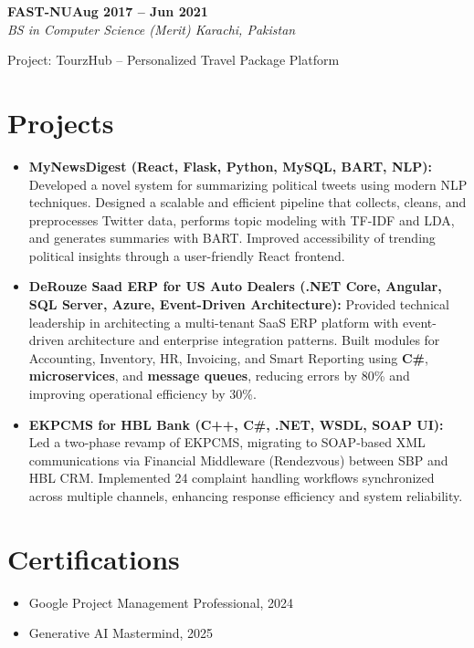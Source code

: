 \documentclass[letterpaper,10pt]{article}
\newcommand{\headingBf}[2]{
  \hspace{10pt}\textbf{#1}\hfill\textbf{#2}\\
}
\newcommand{\headingIt}[2]{
  \hspace{10pt}\textit{#1}\hfill\textit{#2}\\
}
\newenvironment{resume_list}{
  \vspace{-7pt}
  \begin{itemize}[itemsep=-2px, parsep=1pt, leftmargin=30pt]
}{
  \end{itemize}
}
\begin{document}
\headingBf{FAST-NU}{Aug 2017 -- Jun 2021}
\headingIt{BS in Computer Science (Merit) \hfill Karachi, Pakistan}{}
\begin{resume_list}
    \item Project: TourzHub -- Personalized Travel Package Platform
\end{resume_list}

\section{Projects}
\begin{itemize}
    \setlength\itemsep{3pt}
    \item \textbf{MyNewsDigest (React, Flask, Python, MySQL, BART, NLP):} Developed a novel system for summarizing political tweets using modern NLP techniques. Designed a scalable and efficient pipeline that collects, cleans, and preprocesses Twitter data, performs topic modeling with TF-IDF and LDA, and generates summaries with BART. Improved accessibility of trending political insights through a user-friendly React frontend.
    \item \textbf{DeRouze Saad ERP for US Auto Dealers (.NET Core, Angular, SQL Server, Azure, Event-Driven Architecture): } Provided technical leadership in architecting a multi-tenant SaaS ERP platform with event-driven architecture and enterprise integration patterns. Built modules for Accounting, Inventory, HR, Invoicing, and Smart Reporting using \textbf{C\#}, \textbf{microservices}, and \textbf{message queues}, reducing errors by 80\% and improving operational efficiency by 30\%.
    \item \textbf{EKPCMS for HBL Bank (C++, C\#, .NET, WSDL, SOAP UI):} Led a two-phase revamp of EKPCMS, migrating to SOAP-based XML communications via Financial Middleware (Rendezvous) between SBP and HBL CRM. Implemented 24 complaint handling workflows synchronized across multiple channels, enhancing response efficiency and system reliability.
\end{itemize}

\section{Certifications}
\begin{itemize}
    \item Google Project Management Professional, 2024
    \item Generative AI Mastermind, 2025
\end{itemize}

\vspace*{\fill}
\end{document}
